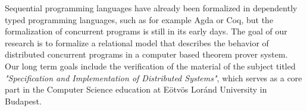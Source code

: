 Sequential programming languages have already been formalized in dependently typed programming languages, such as for example Agda or Coq, but the formalization of concurrent programs is still in its early days. The goal of our research is to formalize a relational model that describes the behavior of distributed concurrent programs in a computer based theorem prover system. Our long term goals include the verification of the material of the subject titled \textit{"Specification and Implementation of Distributed Systems"}, which serves as a core part in the Computer Science education at Eötvös Loránd University in Budapest.
